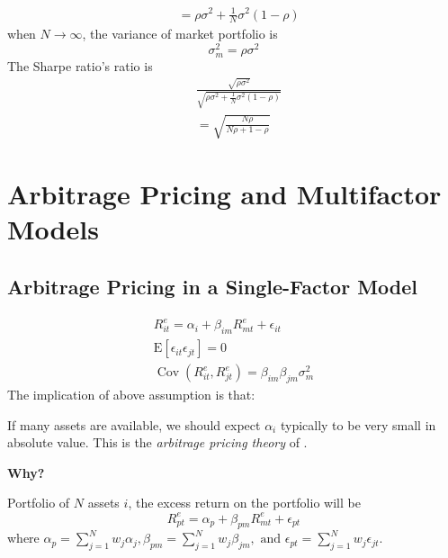 \documentclass[11pt,green,twocol,citestyle=authoryear, bibstyle=authoryear]{elegantbook}
\begin{document}
\begin{solution}
\begin{enumerate}
\begin{equation*}
\begin{aligned}
            &=\rho \sigma^2+\frac{1}{N} \sigma^2(1-\rho)
            \end{aligned}
    \end{equation*}
    when $ N\rightarrow \infty  $, the variance of market portfolio is 
    \begin{equation*}
        \sigma ^2_{m} = \rho \sigma^2
    \end{equation*} 
    The Sharpe ratio's ratio is 
    \begin{equation*}
        \begin{aligned}
            &\frac{\sqrt{\rho \sigma^2}}{\sqrt{\rho \sigma^2+\frac{1}{N} \sigma^2(1-\rho)}} \\
            &=\sqrt{\frac{N \rho}{N \rho +1-\rho}}
            \end{aligned}
    \end{equation*}
\end{enumerate}
\end{solution}

\section{Arbitrage Pricing and Multifactor Models}

\subsection{Arbitrage Pricing in a Single-Factor Model}

\begin{equation*}
    \begin{aligned}
        R_{i t}^e = \alpha_i+\beta_{i m} R_{m t}^e+\epsilon_{i t} \\
        \mathrm{E}\left[\epsilon_{i t} \epsilon_{j t}\right]=0 \\
        \operatorname{Cov}\left(R_{i t}^e, R_{j t}^e\right)=\beta_{i m} \beta_{j m} \sigma_m^2
    \end{aligned}
\end{equation*}
The implication of above assumption is that:

\begin{remark}
    If many assets are available, we should expect $ \alpha_i $ typically to be very small in absolute value. This is the \textit{arbitrage pricing theory} of \cite{Ross_1976}.
\end{remark}

\textbf{Why?}

Portfolio of $ N $ assets $ i $, the excess return on the portfolio will be
\begin{equation*}
    R_{p t}^e=\alpha_p+\beta_{p m} R_{m t}^e+\epsilon_{p t}
\end{equation*}  
where $ \alpha_p=\sum_{j=1}^N w_j \alpha_j, \beta_{p m}=\sum_{j=1}^N w_j \beta_{j m}, \text { and } \epsilon_{p t}=\sum_{j=1}^N w_j \epsilon_{j t} $. 
\end{document}

